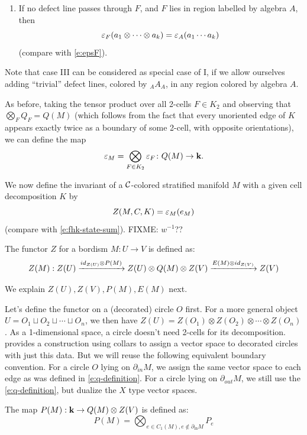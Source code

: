 \begin{defectfiguresetup}
\begin{enumerate}
	\item[III.] If no defect line passes through $F$, and $F$ lies in region
    labelled by algebra $A$, then
    $$
    \varepsilon_F(a_1 \otimes \cdots\otimes  a_k) = \varepsilon_{A}(a_1 \cdots a_k)
    $$
    (compare with \eqref{e:epsF}).
\end{enumerate}

Note that case  III can be considered as special case of I, if we allow
ourselves adding ``trivial'' defect lines, colored by ${}_AA_A$,  in any region
colored by algebra $A$.

As before, taking the tensor product over all 2-cells  $F\in K_2$ and observing
that $\bigotimes_F Q_F=Q(M)$ (which follows from the fact that every unoriented
edge of $K$ appears exactly twice as a boundary of some 2-cell, with opposite
orientations), we can define the map
$$
\varepsilon_M=\bigotimes_{F\in K_2} \varepsilon_F \colon Q(M)\to \mathbf{k}.
$$

We now define the invariant of a $\mathcal{C}$-colored stratified manifold $M$
with a given cell decomposition $K$ by
\begin{equation}\label{e:defect-state-sum}
  Z(M,C,K)=\varepsilon_M (e_M)
\end{equation}
(compare with \eqref{e:fhk-state-sum}). FIXME: $w^{-1}$??


The functor $Z$ for a bordism $M:U\rightarrow V$ is defined as:
\begin{equation}
	Z(M) : Z(U) \xrightarrow{id_{Z(U)} \otimes P(M)} Z(U) \otimes Q(M) \otimes Z(V) \xrightarrow{E(M) \otimes id_{Z(V)}} Z(V)
\end{equation}

We explain $Z(U), Z(V), P(M), E(M)$ next.


Let's define the functor on a (decorated) circle $O$ first. For a more general object $U=O_1 \sqcup O_2 \sqcup \cdots \sqcup O_n$, we then have $Z(U)=Z(O_1)\otimes Z(O_2) \otimes \cdots \otimes Z(O_n)$. As a 1-dimensional space, a circle doesn't need 2-cells for its decomposition.  \cite[Section 2.3]{dkr} provides a construction using collars to assign a vector space to decorated circles with just this data. But we will reuse the following equivalent boundary convention. For a circle $O$ lying on $\partial_{in} M$, we assign the same vector space to each edge as was defined in \eqref{e:q-definition}. For a circle lying on $\partial_{out} M$, we still use the \eqref{e:q-definition}, but dualize the $X$ type vector spaces.

The map $P(M): \mathbf{k} \rightarrow Q(M) \otimes Z(V)$ is defined as:
\begin{equation}
	P(M) = \bigotimes_{e \in C_1(M), e \notin \partial_{\mathrm{in}} M} P_e
\end{equation}


\end{defectfiguresetup}
